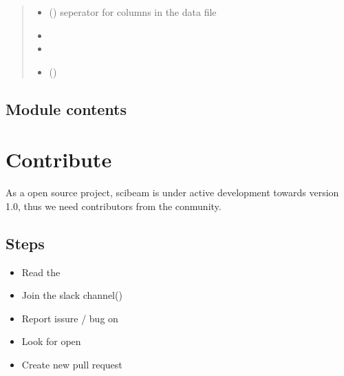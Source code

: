 \documentclass[letterpaper,10pt,english]{sphinxmanual}
\begin{document}
\begin{fulllineitems}
\begin{quote}
\begin{description}
\begin{itemize}
\item {} 
 (\sphinxstyleliteralemphasis{\sphinxupquote{, }}) \textendash{} seperator for columns in the data file

\item {} 
 \textendash{} 

\item {} 
\sphinxstyleliteralstrong{\sphinxupquote{-{-}-{-}-{-}-{-}}} \textendash{} 

\item {} 
 () \textendash{} 

\end{itemize}

\end{description}\end{quote}

\end{fulllineitems}



\section{Module contents}
\label{\detokenize{scibeam.core:module-scibeam.core}}\label{\detokenize{scibeam.core:module-contents}}

\chapter{Contribute}
\label{\detokenize{contribute:contribute}}\label{\detokenize{contribute::doc}}
As a open source project, scibeam is under active development towards version 1.0, thus we need contributors from the conmunity.


\section{Steps}
\label{\detokenize{contribute:steps}}\begin{itemize}
\item {} 
Read the 

\item {} 
Join the slack channel()

\item {} 
Report issure / bug on 

\item {} 
Look for open 

\item {} 
Create new pull request

\end{itemize}
\end{document}
